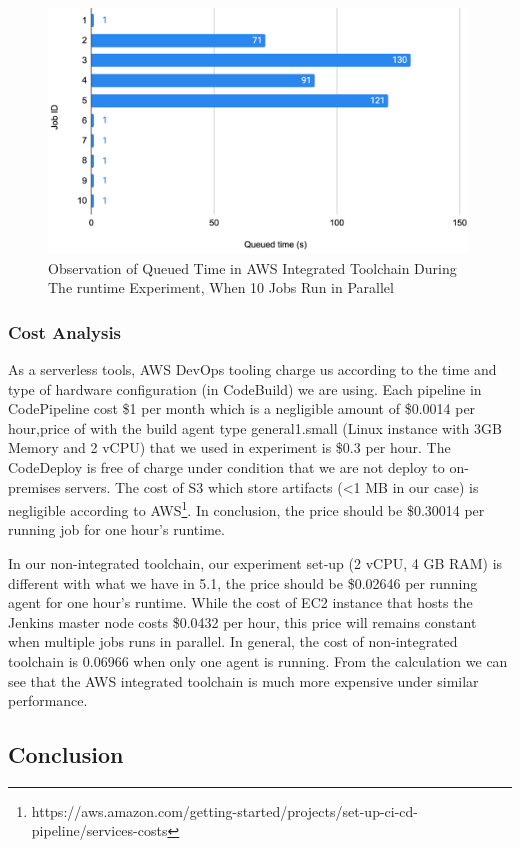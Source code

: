  \begin{figure}[h]
    \centering
    \includegraphics[width=0.99\textwidth]{pics/queued_time.png}
    \caption{Observation of Queued Time in AWS Integrated Toolchain During The runtime Experiment, When 10 Jobs Run in Parallel}
    \label{fig:queued}
    \end{figure}
 \subsubsection{Cost Analysis}
 As a serverless tools, AWS DevOps tooling charge us according to the time and type of hardware configuration (in CodeBuild) we are using.
  Each pipeline in CodePipeline cost \$1 per month which is a negligible amount of \$0.0014 per hour,price of with the build agent type general1.small (Linux instance with 3GB Memory and 2 vCPU) that we used in experiment is \$0.3 per hour. The CodeDeploy is free of charge under condition that we are not deploy to on-premises servers. The cost of S3 which store artifacts (<1 MB in our case) is negligible according to AWS\footnote{https://aws.amazon.com/getting-started/projects/set-up-ci-cd-pipeline/services-costs}. In conclusion, the price should be \$0.30014 per running job for one hour's runtime.
  \par
  In our non-integrated toolchain, our experiment set-up (2 vCPU, 4 GB RAM) is different with what we have in 5.1, the price should be \$0.02646 per running agent for one hour's runtime. While the cost of EC2 instance that hosts the Jenkins master node costs \$0.0432 per hour, this price will remains constant when multiple jobs runs in parallel. In general, the cost of non-integrated toolchain is 0.06966 when only one agent is running.
From the calculation we can see that the AWS integrated toolchain is much more expensive under similar performance.

\subsection{Conclusion}

